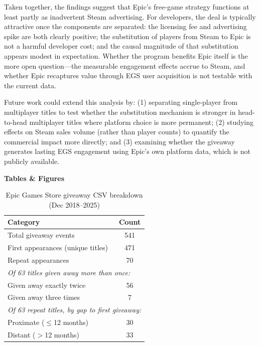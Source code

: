 \documentclass[11pt]{article}
\begin{document}
Taken together, the findings suggest that Epic's free-game strategy functions at
least partly as inadvertent Steam advertising. For developers, the deal is
typically attractive once the components are separated: the licensing fee and
advertising spike are both clearly positive; the substitution of players from
Steam to Epic is not a harmful developer cost; and the causal
magnitude of that substitution appears modest in expectation. Whether the
program benefits Epic itself is the more open question---the measurable
engagement effects accrue to Steam, and whether Epic recaptures value through
EGS user acquisition is not testable with the current data.

Future work could extend this analysis by: (1) separating single-player from
multiplayer titles to test whether the substitution mechanism is stronger in
head-to-head multiplayer titles where platform choice is more permanent; (2) studying
effects on Steam sales volume (rather than player counts) to quantify the commercial
impact more directly; and (3) examining whether the giveaway generates lasting EGS
engagement using Epic's own platform data, which is not publicly available.

\clearpage


\begin{center}
{\large\bfseries Tables \& Figures}
\end{center}

\vspace{1em}

\begin{table}[H]
\centering\small
\caption{Epic Games Store giveaway CSV breakdown (Dec 2018--2025)}
\label{tab:epic_csv}
\begin{tabular}{lc}
\toprule
Category & Count \\
\midrule
Total giveaway events & 541 \\
\quad First appearances (unique titles) & 471 \\
\quad Repeat appearances & 70 \\
\midrule
\multicolumn{2}{l}{\textit{Of 63 titles given away more than once:}} \\
\quad Given away exactly twice & 56 \\
\quad Given away three times & 7 \\
\midrule
\multicolumn{2}{l}{\textit{Of 63 repeat titles, by gap to first giveaway:}} \\
\quad Proximate ($\leq$12 months) & 30 \\
\quad Distant ($>$12 months) & 33 \\
\bottomrule
\end{tabular}
\end{table}
\end{document}
